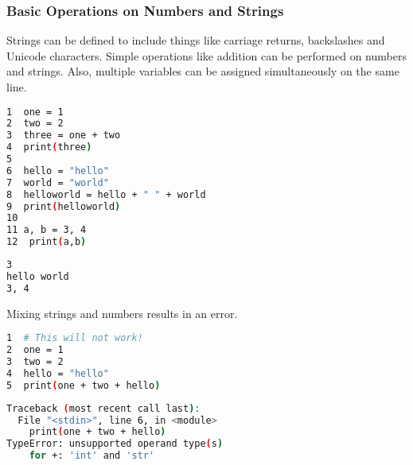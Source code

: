 \documentclass[crop=false,class=book]{standalone}
\begin{document}
\subsubsection{Basic Operations on Numbers and Strings}
Strings can be defined to include things like carriage returns, backslashes and Unicode characters. Simple operations like addition can be performed on numbers and strings. Also, multiple variables can be assigned simultaneously on the same line.\newline
\begin{minipage}[t]{.48\textwidth}
\centering
\begin{lstlisting}[language=bash,basicstyle=\small\ttfamily,frame=single,caption=input]
1  one = 1
2  two = 2
3  three = one + two
4  print(three)
5
6  hello = "hello"
7  world = "world"
8  helloworld = hello + " " + world
9  print(helloworld)
10
11 a, b = 3, 4
12  print(a,b)
\end{lstlisting}
\end{minipage}\hfill
\begin{minipage}[t]{.48\textwidth}
\centering
\begin{lstlisting}[language=bash,basicstyle=\small\ttfamily,frame=single,caption=output]
3
hello world
3, 4
\end{lstlisting}
\end{minipage}\newline
Mixing strings and numbers results in an error.\newline
\begin{minipage}[t]{.48\textwidth}
\centering
\begin{lstlisting}[language=bash,basicstyle=\small\ttfamily,frame=single,caption=input]
1  # This will not work!
2  one = 1
3  two = 2
4  hello = "hello"
5  print(one + two + hello)
\end{lstlisting}
\end{minipage}\hfill
\begin{minipage}[t]{.48\textwidth}
\centering
\begin{lstlisting}[language=bash,basicstyle=\small\ttfamily,frame=single,caption=output]
Traceback (most recent call last):
  File "<stdin>", line 6, in <module>
    print(one + two + hello)
TypeError: unsupported operand type(s)
    for +: 'int' and 'str'
\end{lstlisting}
\end{minipage}
\newpage
\end{document}
